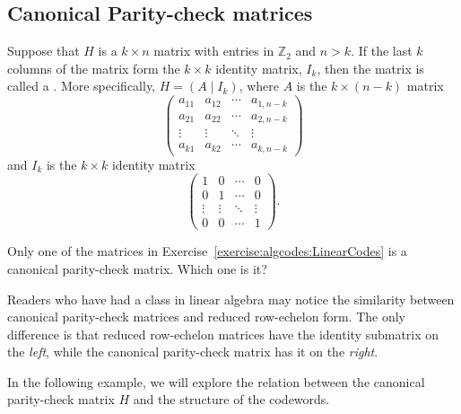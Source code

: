 \subsection{Canonical Parity-check matrices\quad
{}}

\begin{defn}
  Suppose that $H$ is a $k \times n$ matrix with entries in
$\mathbb{Z}_2$ and $n > k$. If the last $k$ columns of the
matrix form the $k \times k$ identity matrix, $I_k$, then
the matrix is called a . More specifically, $H= (A \mid I_k
)$, where $A$ is the $k \times (n-k)$ matrix
\[
\left(
\begin{array}{cccc}
a_{11} & a_{12} & \cdots & a_{1,n-k} \\
a_{21} & a_{22} & \cdots & a_{2,n-k} \\
\vdots & \vdots & \ddots & \vdots    \\
a_{k1} & a_{k2} & \cdots & a_{k,n-k}
\end{array}
\right)
\]
and $I_k$ is the $k \times k$ identity matrix
\[
\left(
\begin{array}{cccc}
1 & 0 & \cdots & 0 \\
0 & 1 & \cdots & 0 \\
\vdots & \vdots & \ddots & \vdots \\
0 & 0 & \cdots & 1
\end{array}
\right).
\]
\end{defn}

\begin{exercise}{}
Only one of the matrices in Exercise~\ref{exercise:algcodes:LinearCodes} is a canonical parity-check matrix. Which one is it?
\end{exercise}

Readers who have had a class in linear algebra may notice the similarity between canonical parity-check matrices and reduced row-echelon form. The only difference is that reduced row-echelon matrices have the identity submatrix on the \emph{left}, while the canonical parity-check matrix has it on the \emph{right}.

In the following example, we will explore the relation between the canonical parity-check matrix $H$ and the structure of the codewords.
 

